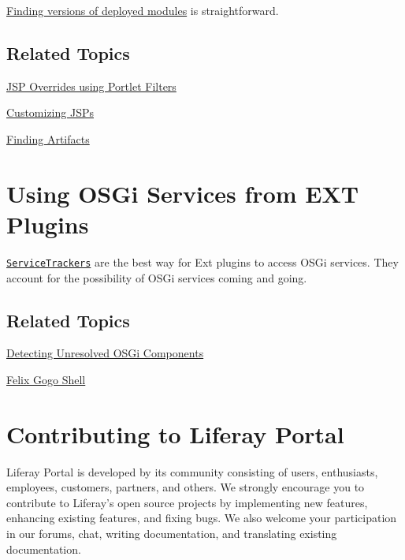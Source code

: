 \href{/docs/7-2/customization/-/knowledge_base/c/finding-artifacts}{Finding
versions of deployed modules} is straightforward.

\section{Related Topics}\label{related-topics-14}

\href{/docs/7-2/customization/-/knowledge_base/c/jsp-overrides-using-portlet-filters}{JSP
Overrides using Portlet Filters}

\href{/docs/7-2/customization/-/knowledge_base/c/customizing-jsps}{Customizing
JSPs}

\href{/docs/7-2/customization/-/knowledge_base/c/finding-artifacts}{Finding
Artifacts}

\chapter{Using OSGi Services from EXT
Plugins}\label{using-osgi-services-from-ext-plugins}

\href{/docs/7-2/frameworks/-/knowledge_base/f/service-trackers-for-osgi-services}{\texttt{ServiceTrackers}}
are the best way for Ext plugins to access OSGi services. They account
for the possibility of OSGi services coming and going.

\section{Related Topics}\label{related-topics-15}

\href{/docs/7-2/appdev/-/knowledge_base/a/detecting-unresolved-osgi-components}{Detecting
Unresolved OSGi Components}

\href{/docs/7-2/customization/-/knowledge_base/c/using-the-felix-gogo-shell}{Felix
Gogo Shell}

\chapter{Contributing to Liferay
Portal}\label{contributing-to-liferay-portal}

Liferay Portal is developed by its community consisting of users,
enthusiasts, employees, customers, partners, and others. We strongly
encourage you to contribute to Liferay's open source projects by
implementing new features, enhancing existing features, and fixing bugs.
We also welcome your participation in our forums, chat, writing
documentation, and translating existing documentation.


